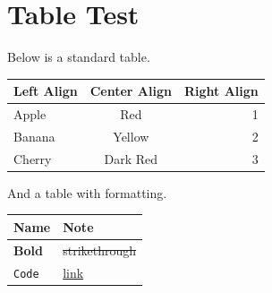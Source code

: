 \section{Table Test}

Below is a standard table.

\begin{table}[h!]
    \centering
    \begin{tabular}{ l | c | r }
        \textbf{Left Align} & \textbf{Center Align} & \textbf{Right Align} \\
        \hline
        Apple & Red & 1 \\
        Banana & Yellow & 2 \\
        Cherry & Dark Red & 3 \\
    \end{tabular}
\end{table}

And a table with formatting.

\begin{table}[h!]
    \centering
    \begin{tabular}{ l | l }
        \textbf{Name} & \textbf{Note} \\
        \hline
        \textbf{Bold} & \sout{strikethrough} \\
        \texttt{Code} & \href{http}{link} \\
    \end{tabular}
\end{table}

